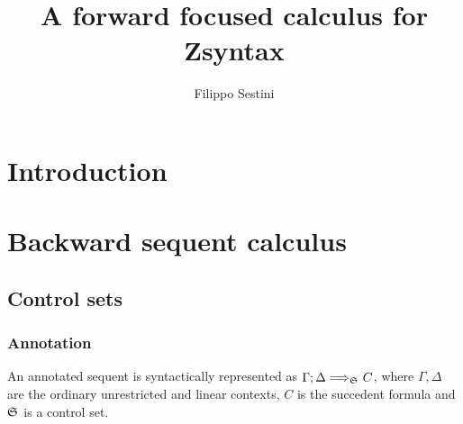\documentclass{docs}
\title{A forward focused calculus for Zsyntax}
\author{Filippo Sestini}
\begin{document}
\maketitle
\tableofcontents

\section{Introduction}

\section{Backward sequent calculus}

\subsection{Control sets}

\subsubsection{Annotation}

\begin{definition}
  An annotated sequent is syntactically represented as $\Gamma; \Delta
  \Longrightarrow_{\mathfrak{S}_{}} C$, where $\Gamma, \Delta$ are the ordinary
  unrestricted and linear contexts, $C$ is the succedent formula and
  $\mathfrak{S}_{}$ is a control set.
\end{definition}
\end{document}
